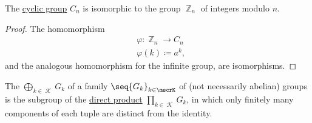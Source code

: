 \begin{proposition}\label{thm:cyclic_group_isomorphic_to_integers_modulo_n}
  The \hyperref[def:cyclic_group]{cyclic group} \( C_n \) is isomorphic to the group \hyperref[def:group_of_integers_modulo]{\( \BbbZ_n \)} of integers modulo \( n \).
\end{proposition}
\begin{proof}
  The homomorphism
  \begin{equation*}
    \begin{aligned}
      &\varphi: \BbbZ_n \to C_n \\
      &\varphi(k) \coloneqq a^k,
    \end{aligned}
  \end{equation*}
  and the analogous homomorphism for the infinite group, are isomorphisms.
\end{proof}

\begin{definition}\label{def:group_direct_sum}
  The  \( \bigoplus_{k \in \mscrK} G_k \) of a family \( \seq{ G_k }_{k \in \mscrK} \) of (not necessarily abelian) groups is the subgroup of the \hyperref[def:group_direct_product]{direct product} \( \prod_{k \in \mscrK} G_k \), in which only finitely many components of each tuple are distinct from the identity.
\end{definition}

